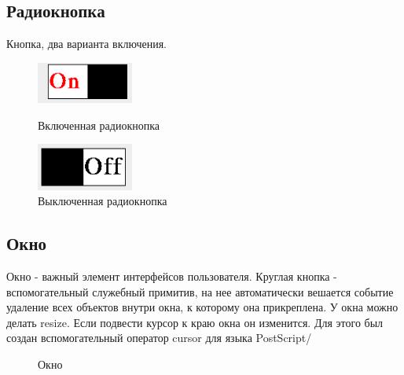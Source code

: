 \documentclass[14pt]{extarticle}
\begin{document}
	\subsection{Радиокнопка}
		Кнопка, два варианта включения.
		\begin{figure}[h]
		\begin{center}
		\begin{minipage}[h]{0.4\linewidth}
		\includegraphics[width=90pt]{pictures/toggleButton1.png}
		\caption{ Включенная радиокнопка} %
		\label{ris:b1} %
		\end{minipage}
		\hfill 
		\begin{minipage}[h]{0.4\linewidth}
		\includegraphics[width=90pt]{pictures/toggleButton2.png}
		\caption{Выключенная радиокнопка}
		\label{ris:b2}
		\end{minipage}
		\end{center}
		\end{figure}
		
	\subsection{Окно}
	Окно - важный элемент интерфейсов пользователя.
	Круглая кнопка - вспомогательный служебный примитив, на нее автоматически вешается событие удаление всех объектов внутри окна, к которому она прикреплена.
	У окна можно делать resize. Если подвести курсор к краю окна он изменится. Для этого был создан вспомогательный оператор cursor для языка PostScript/
		\begin{figure}[h]
		\caption{ Окно }
		\label{ris:image}
		\end{figure}	
	\pagebreak
\end{document}
